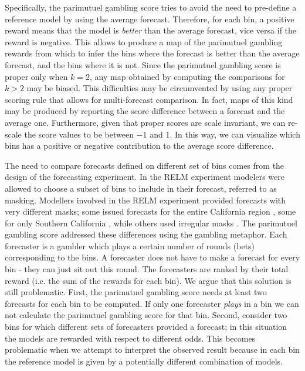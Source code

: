 \documentclass[referee,sn-basic]{sn-jnl}
\theoremstyle{thmstyleone}%
\theoremstyle{thmstyletwo}%
\theoremstyle{thmstylethree}%
\begin{document}
Specifically, the parimutuel gambling score tries to avoid the need to pre-define a reference model by using the average forecast. Therefore, for each bin, a positive reward means that the model is \emph{better} than the average forecast, vice versa if the reward is negative. This allows to produce a map of the parimutuel gambling rewards from which to infer the bins where the forecast is better than the average forecast, and the bins where it is not. Since the parimutuel gambling score is proper only when $k = 2$, any map obtained by computing the comparisons for $k > 2$ may be biased. This difficulties may be circumvented by using any proper scoring rule that allows for multi-forecast comparison. In fact, maps of this kind may be produced by reporting the score difference between a forecast and the average one. Furthermore, given that proper scores are scale invariant, we can re-scale the score values to be between $-1$ and $1$. In this way, we can visualize which bins has a positive or negative contribution to the average score difference. 

The need to compare forecasts defined on different set of bins comes from the design of the forecasting experiment. In the RELM experiment \citep{zechar2013regional} modelers were allowed to choose a subset of bins to include in their forecast, referred to as masking. Modellers involved in the RELM experiment provided forecasts with very different masks; some issued forecasts for the entire California region \citep{bird2007seismic, helmstetter2007high, holliday2007relm}, some for only Southern California \citep{ward2007methods, shen2007implications, kagan2007testable}, while others used irregular masks \citep{ebel2007non}. The parimutuel gambling score addressed these differences using the gambling metaphor. Each forecaster is a gambler which plays a certain number of rounds (bets) corresponding to the bins. A forecaster does not have to make a forecast for every bin - they can just sit out this round. The forecasters are ranked by their total reward (i.e. the sum of the rewards for each bin). We argue that this solution is still problematic. First, the parimutuel gambling score needs at least two forecasts for each bin to be computed. If only one forecaster \emph{plays} in a bin we can not calculate the parimutuel gambling score for that bin. Second, consider two bins for which different sets of forecasters provided a forecast; in this situation the models are rewarded with respect to different odds. This becomes problematic when we attempt to interpret the observed result because in each bin the reference model is given by a potentially different combination of models.
\end{document}
